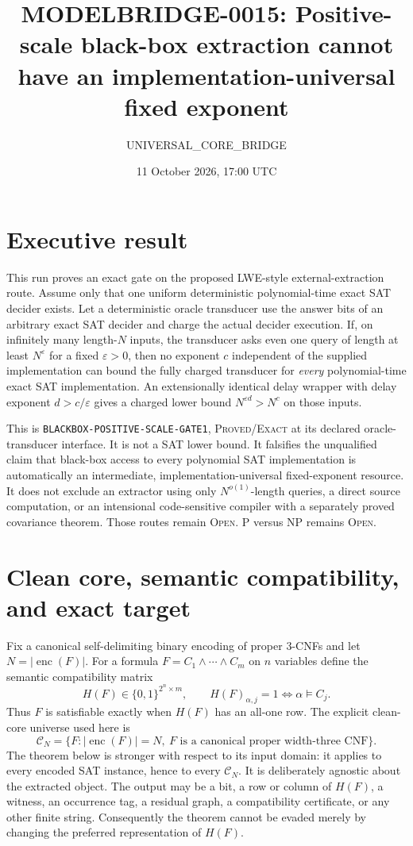 \documentclass[11pt]{article}
\title{MODELBRIDGE-0015: Positive-scale black-box extraction cannot have an implementation-universal fixed exponent}
\author{UNIVERSAL\_CORE\_BRIDGE}
\date{11 October 2026, 17:00 UTC}
\newcommand{\status}[1]{\textsc{#1}}
\begin{document}
\maketitle

\section*{Executive result}

This run proves an exact gate on the proposed LWE-style external-extraction
route.  Assume only that one uniform deterministic polynomial-time exact SAT
decider exists.  Let a deterministic oracle transducer use the answer bits of
an arbitrary exact SAT decider and charge the actual decider execution.  If,
on infinitely many length-$N$ inputs, the transducer asks even one query of
length at least $N^\varepsilon$ for a fixed $\varepsilon>0$, then no exponent
$c$ independent of the supplied implementation can bound the fully charged
transducer for \emph{every} polynomial-time exact SAT implementation.  An
extensionally identical delay wrapper with delay exponent
$d>c/\varepsilon$ gives a charged lower bound $N^{\varepsilon d}>N^c$ on
those inputs.

This is \texttt{BLACKBOX-POSITIVE-SCALE-GATE1}, \status{Proved/Exact} at its
declared oracle-transducer interface.  It is not a SAT lower bound.  It
falsifies the unqualified claim that black-box access to every polynomial SAT
implementation is automatically an intermediate, implementation-universal
fixed-exponent resource.  It does not exclude an extractor using only
$N^{o(1)}$-length queries, a direct source computation, or an intensional
code-sensitive compiler with a separately proved covariance theorem.  Those
routes remain \status{Open}.  P versus NP remains \status{Open}.

\section{Clean core, semantic compatibility, and exact target}

Fix a canonical self-delimiting binary encoding of proper 3-CNFs and let
$N=|\operatorname{enc}(F)|$.  For a formula
$F=C_1\wedge\cdots\wedge C_m$ on $n$ variables define the semantic
compatibility matrix
\[
 H(F)\in\{0,1\}^{2^n\times m},\qquad
 H(F)_{\alpha,j}=1\iff \alpha\models C_j.
\]
Thus $F$ is satisfiable exactly when $H(F)$ has an all-one row.  The explicit
clean-core universe used here is
\[
 \mathcal C_N=\{F:|\operatorname{enc}(F)|=N,\ F\text{ is a canonical proper
 width-three CNF}\}.
\]
The theorem below is stronger with respect to its input domain: it applies to
every encoded SAT instance, hence to every $\mathcal C_N$.  It is deliberately
agnostic about the extracted object.  The output may be a bit, a row or column
of $H(F)$, a witness, an occurrence tag, a residual graph, a compatibility
certificate, or any other finite string.  Consequently the theorem cannot be
evaded merely by changing the preferred representation of $H(F)$.
\end{document}
